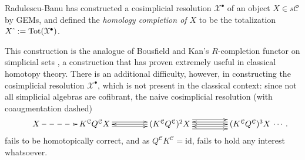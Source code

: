 \documentclass[11pt]{amsart} \renewcommand{\baselinestretch}{1.4}
\theoremstyle{plain}
\theoremstyle{definition}
\newcommand{\calx}{\mathcal{X}}
\newcommand{\calc}{\mathcal{C}}
\newcommand{\Id}{\mathrm{id}}
\begin{document}
\begin{Pi-algebras and cohomology algebras}
Radulescu-Banu \cite{Radulescu-Banu.pdf} has constructed a cosimplicial resolution $\calx^\bullet$ of an object $X\in s\calc$ by GEMs, and defined the \emph{homology completion of $X$} to be the totalization $X\hat{\ }:=\textup{Tot}(\calx^\bullet)$. 

This construction is the analogue of Bousfield and Kan's $R$-completion functor on simplicial sets \cite{BousKanSSeq.pdf}, a construction that has proven extremely useful in classical homotopy theory.
There is an additional difficulty, however,  in constructing the cosimplicial resolution $\calx^{\bullet}$, which is not present in the classical context: since not all simplicial algebras are cofibrant, the naive cosimplicial resolution (with coaugmentation dashed)
\[\makebox[0cm][r]{\,$\qquad $}\vcenter{
\def\labelstyle{\scriptstyle}
\xymatrix@C=1.5cm@1{
X\,
\ar@{-->}[r]
&
\,K^{\calc}Q^{\calc}X\,
\ar[r];[]
&
\,(K^{\calc}Q^{\calc})^2X\,
\ar@<-.65ex>[l];[]
\ar@<+.65ex>[l];[]
\ar@<+.65ex>[r];[]
\ar@<-.65ex>[r];[]
&
\,(K^{\calc}Q^{\calc})^3X\,\makebox[0cm][l]{\,$\cdots. $}
\ar[l];[]
\ar@<-1.3ex>[l];[]
\ar@<+1.3ex>[l];[]
}}\]
fails to be homotopically correct, and  as $Q^{\calc}K^{\calc}=\Id$, fails to hold any interest whatsoever.


\end{Pi-algebras and cohomology algebras}
\end{document}
